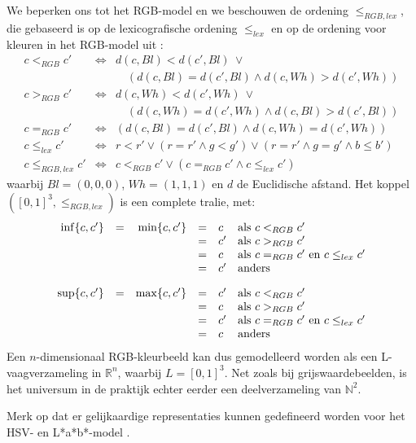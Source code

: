 We beperken ons tot het RGB-model en we beschouwen de ordening $\leq_{RGB,lex}$, die
gebaseerd is op de lexicografische ordening $\leq_{lex}$ en op de ordening voor kleuren in het 
RGB-model uit \cite{dewitte:vect_morph_ops}:
$$
\begin{array}{rcl}
c <_{RGB} c' & \iff & d(c,Bl) < d(c',Bl)\ \lor \\
			   &	  & \quad(d(c,Bl) = d(c',Bl) \land d(c,Wh) > d(c',Wh)) \\[5pt]
c >_{RGB} c' & \iff & d(c,Wh) < d(c',Wh)\ \lor \\
			   &	  & \quad(d(c,Wh) = d(c',Wh) \land d(c,Bl) > d(c',Bl)) \\[5pt]
c =_{RGB} c'   & \iff & (d(c,Bl) = d(c',Bl) \land d(c,Wh) = d(c',Wh)) \\[10pt]
c \leq_{lex} c' & \iff & r < r' \lor (r = r' \land g < g') \lor (r = r' \land g = g' \land b \leq b') \\[10pt]
c \leq_{RGB,lex} c' & \iff & c <_{RGB} c' \lor (c =_{RGB} c' \land c \leq_{lex} c')
\end{array}
$$
waarbij $Bl = (0,0,0)$, $Wh = (1,1,1)$ en $d$ de Euclidische afstand.
Het koppel $([0,1]^3,\leq_{RGB,lex})$ is een complete tralie, met:
$$
\begin{array}{@{}c@{}}
\begin{array}{rcrcll}
\inf \{c,c'\} & = & \min \{c,c'\} & = & c & \textrm{als } c <_{RGB} c' \\
		  	& & & = & c' & \textrm{als } c >_{RGB} c' \\
		  	& & & = & c & \textrm{als } c =_{RGB} c' \textrm{ en } c \leq_{lex} c' \\
		  	& & & = & c' & \textrm{anders} \\[10pt]
\sup \{c,c'\} & = & \max \{c,c'\} & = & c' & \textrm{als } c <_{RGB} c' \\
		  	& & & = & c & \textrm{als } c >_{RGB} c' \\
		  	& & & = & c' & \textrm{als } c =_{RGB} c' \textrm{ en } c \leq_{lex} c' \\
		  	& & & = & c & \textrm{anders}
\end{array}
\end{array}
$$
Een $n$-dimensionaal RGB-kleurbeeld kan dus gemodelleerd worden als een L-vaagverzameling in 
$\mathbb{R}^n$, waarbij $L=[0,1]^3$. Net zoals bij grijswaardebeelden, is 
het universum in de praktijk echter eerder een deelverzameling van $\mathbb{N}^2$.

Merk op dat er gelijkaardige representaties kunnen gedefineerd worden voor het HSV- en L*a*b*-model
\cite{vanderweken:construction_of_quality_measures}.

